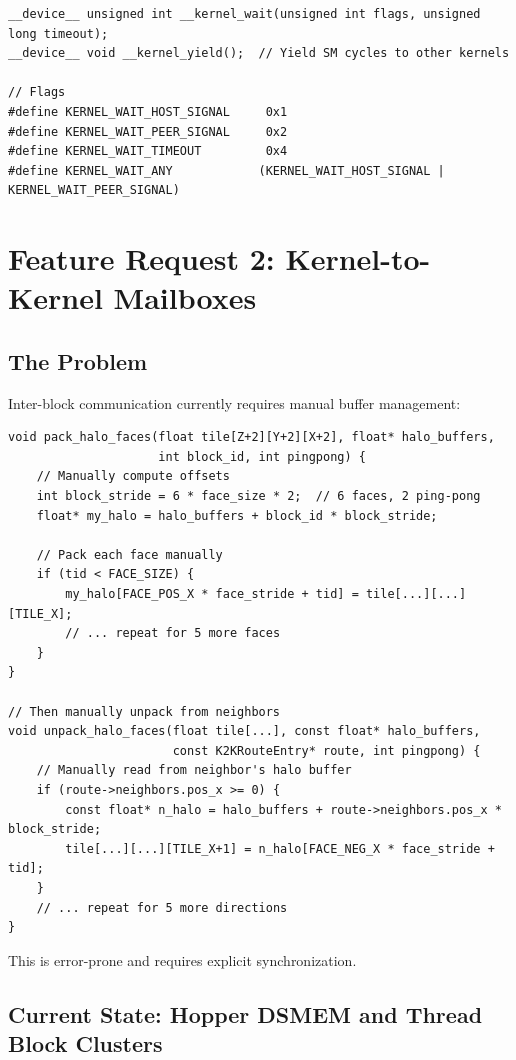 \documentclass[11pt,a4paper]{article}
\begin{document}
\begin{lstlisting}[style=cstyle,title={Device intrinsics}]
__device__ unsigned int __kernel_wait(unsigned int flags, unsigned long timeout);
__device__ void __kernel_yield();  // Yield SM cycles to other kernels

// Flags
#define KERNEL_WAIT_HOST_SIGNAL     0x1
#define KERNEL_WAIT_PEER_SIGNAL     0x2
#define KERNEL_WAIT_TIMEOUT         0x4
#define KERNEL_WAIT_ANY            (KERNEL_WAIT_HOST_SIGNAL | KERNEL_WAIT_PEER_SIGNAL)
\end{lstlisting}

\newpage

\section{Feature Request 2: Kernel-to-Kernel Mailboxes}

\subsection{The Problem}

Inter-block communication currently requires manual buffer management:

\begin{lstlisting}[style=cstyle,title={Current: Manual halo exchange}]
void pack_halo_faces(float tile[Z+2][Y+2][X+2], float* halo_buffers,
                     int block_id, int pingpong) {
    // Manually compute offsets
    int block_stride = 6 * face_size * 2;  // 6 faces, 2 ping-pong
    float* my_halo = halo_buffers + block_id * block_stride;

    // Pack each face manually
    if (tid < FACE_SIZE) {
        my_halo[FACE_POS_X * face_stride + tid] = tile[...][...][TILE_X];
        // ... repeat for 5 more faces
    }
}

// Then manually unpack from neighbors
void unpack_halo_faces(float tile[...], const float* halo_buffers,
                       const K2KRouteEntry* route, int pingpong) {
    // Manually read from neighbor's halo buffer
    if (route->neighbors.pos_x >= 0) {
        const float* n_halo = halo_buffers + route->neighbors.pos_x * block_stride;
        tile[...][...][TILE_X+1] = n_halo[FACE_NEG_X * face_stride + tid];
    }
    // ... repeat for 5 more directions
}
\end{lstlisting}

This is error-prone and requires explicit synchronization.

\subsection{Current State: Hopper DSMEM and Thread Block Clusters}
\end{document}
